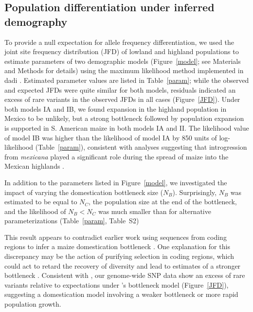\subsection*{Population differentiation under inferred demography}

To provide a null expectation for allele frequency differentiation, we used the joint site frequency distribution (JFD) of lowland and highland populations to estimate parameters of two demographic models (Figure~\ref{model}; see Materials and Methods for details) using the maximum likelihood method implemented in {\sf dadi} \citep{Gutenkunst_2009_19851460}.  
Estimated parameter values are listed in Table~\ref{param}; 
while the observed and expected JFDs were quite similar for both models,  
residuals indicated an excess of rare variants in the observed JFDs in all cases (Figure~\ref{JFD}). 
Under both models IA and IB,  we found expansion in the highland population in Mexico to be unlikely, but a strong bottleneck followed by population expansion is supported in S. American maize in both models IA and II.  
The likelihood value of model IB was higher than the likelihood of model IA by 850 units of log-likelihood (Table~\ref{param}), 
consistent with analyses suggesting that introgression from \textit{mexicana} played a significant role during the spread of maize into the Mexican highlands \citep{Profford_2013}. 

In addition to the parameters listed in Figure~\ref{model}, we investigated the impact of varying the domestication bottleneck size ($N_B$).  
Surprisingly, $N_B$ was estimated to be equal to $N_C$, the population size at the end of the bottleneck, and the likelihood of $N_B<N_C$ was much smaller than for alternative parameterizations (Table~\ref{param}, Table~S2) 

This result appears to contradict earlier work using sequences from coding regions to infer a maize domestication bottleneck \cite[]{Eyre-Walker_1998_9539756,Tenaillon_2004_15014173,Wright_2005_15919994}.  One explanation for this discrepancy may be the action of purifying selection in coding regions, which could act to retard the recovery of diversity and lead to estimates of a stronger bottleneck \cite{Hufford_2012_22660546}.  Consistent with \citet{Hufford_2012_22660546}, our genome-wide SNP data show an excess of rare variants relative to expectations under \cite{Wright_2005_15919994}'s bottleneck model (Figure~\ref{JFD}), suggesting a domestication model involving a weaker bottleneck or more rapid population growth.


